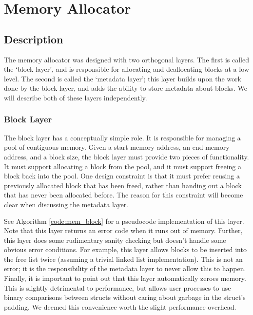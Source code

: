 \documentclass[12pt]{report}
\begin{document}
\chapter{Memory Allocator}

\section{Description}
    The memory allocator was designed with two orthogonal layers. The first is
    called the `block layer', and is responsible for allocating and deallocating
    blocks at a low level. The second is called the `metadata layer'; this layer
    builds upon the work done by the block layer, and adds the ability to store
    metadata about blocks. We will describe both of these layers independently.

\subsection{Block Layer}
    The block layer has a conceptually simple role. It is responsible for
    managing a pool of contiguous memory. Given a start memory address, an
    end memory address, and a block size, the block
    layer must provide two pieces of functionality. It must support allocating
    a block from the pool, and it must support freeing a block back into the
    pool. One design constraint is that it must prefer reusing a previously
    allocated block that has been freed, rather than handing out a block that
    has never been allocated before. The reason for this constraint will
    become clear when discussing the metadata layer.

    See Algorithm \ref{code:mem_block} for a pseudocode implementation of this
    layer. Note that this layer returns an error code when it runs out of
    memory. Further, this layer does some rudimentary sanity checking but
    doesn't handle some obvious error conditions. For example, this layer allows
    blocks to be inserted into the free list twice (assuming a trivial linked
    list implementation). This is not an error; it is the responsibility of
    the metadata layer to never allow this to happen. Finally, it is important
    to point out that this layer automatically zeroes memory. This is slightly
    detrimental to performance, but allows user processes to use binary
    comparisons between structs without caring about garbage in the struct's
    padding. We deemed this convenience worth the slight performance overhead.
\end{document}
